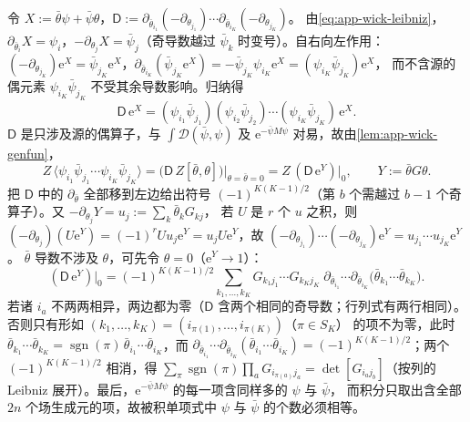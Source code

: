 \documentclass[UTF8,a4paper,11pt,fontset=fandol]{ctexart}
\makeatletter
\theoremstyle{cplain}
\theoremstyle{cdefinition}
\theoremstyle{cremark}
\renewcommand{\proofname}{证明}
\renewenvironment{proof}[1][\proofname]{\par\pushQED{\qed}\normalfont\topsep6\p@\@plus6\p@\relax
  \trivlist\item[\hskip\labelsep\itshape #1\hspace{0.5em}]\ignorespaces}{\popQED\endtrivlist\@endpefalse}
\numberwithin{equation}{section}
\newcommand{\ee}{\mathrm{e}}                        %
\makeatother
\begin{document}
\begin{proof}
令 $X:=\bar\theta\psi+\bar\psi\theta$，$\mathsf D:=\partial_{\bar\theta_{i_1}}(-\partial_{\theta_{j_1}})\cdots\partial_{\bar\theta_{i_K}}(-\partial_{\theta_{j_K}})$。
由\cref{eq:app-wick-leibniz}，$\partial_{\bar\theta_i}X=\psi_i$，$-\partial_{\theta_j}X=\bar\psi_j$（奇导数越过 $\bar\psi_k$ 时变号）。自右向左作用：
$(-\partial_{\theta_{j_K}})\ee^X=\bar\psi_{j_K}\ee^X$，$\partial_{\bar\theta_{i_K}}(\bar\psi_{j_K}\ee^X)=-\bar\psi_{j_K}\psi_{i_K}\ee^X=(\psi_{i_K}\bar\psi_{j_K})\ee^X$，
而不含源的偶元素 $\psi_{i_K}\bar\psi_{j_K}$ 不受其余导数影响。归纳得
\begin{equation*}
\mathsf D\,\ee^X=(\psi_{i_1}\bar\psi_{j_1})(\psi_{i_2}\bar\psi_{j_2})\cdots(\psi_{i_K}\bar\psi_{j_K})\,\ee^X .
\end{equation*}
$\mathsf D$ 是只涉及源的偶算子，与 $\int\mathcal D(\bar\psi,\psi)$ 及 $\ee^{-\bar\psi M\psi}$ 对易，故由\cref{lem:app-wick-genfun}，
\begin{equation*}
Z\,\bigl\langle\psi_{i_1}\bar\psi_{j_1}\cdots\psi_{i_K}\bar\psi_{j_K}\bigr\rangle=\bigl(\mathsf D\,Z[\bar\theta,\theta]\bigr)\big|_{\theta=\bar\theta=0}=Z\,(\mathsf D\,\ee^{Y})\big|_0,\qquad Y:=\bar\theta G\theta .
\end{equation*}
把 $\mathsf D$ 中的 $\partial_{\bar\theta}$ 全部移到左边给出符号 $(-1)^{K(K-1)/2}$（第 $b$ 个需越过 $b-1$ 个奇算子）。又 $-\partial_{\theta_j}Y=u_j:=\sum_k\bar\theta_kG_{kj}$，
若 $U$ 是 $r$ 个 $u$ 之积，则 $(-\partial_{\theta_j})(U\ee^Y)=(-1)^rUu_j\ee^Y=u_jU\ee^Y$，故 $(-\partial_{\theta_{j_1}})\cdots(-\partial_{\theta_{j_K}})\ee^Y=u_{j_1}\cdots u_{j_K}\ee^Y$。
$\bar\theta$ 导数不涉及 $\theta$，可先令 $\theta=0$（$\ee^Y\to1$）：
\begin{equation*}
(\mathsf D\,\ee^Y)\big|_0=(-1)^{K(K-1)/2}\sum_{k_1,\dots,k_K}G_{k_1j_1}\cdots G_{k_Kj_K}\;
\partial_{\bar\theta_{i_1}}\cdots\partial_{\bar\theta_{i_K}}\bigl(\bar\theta_{k_1}\cdots\bar\theta_{k_K}\bigr).
\end{equation*}
若诸 $i_a$ 不两两相异，两边都为零（$\mathsf D$ 含两个相同的奇导数；行列式有两行相同）。否则只有形如 $(k_1,\dots,k_K)=(i_{\pi(1)},\dots,i_{\pi(K)})$（$\pi\in S_K$）
的项不为零，此时 $\bar\theta_{k_1}\cdots\bar\theta_{k_K}=\operatorname{sgn}(\pi)\,\bar\theta_{i_1}\cdots\bar\theta_{i_K}$，而
$\partial_{\bar\theta_{i_1}}\cdots\partial_{\bar\theta_{i_K}}(\bar\theta_{i_1}\cdots\bar\theta_{i_K})=(-1)^{K(K-1)/2}$；两个 $(-1)^{K(K-1)/2}$ 相消，得
$\sum_\pi\operatorname{sgn}(\pi)\prod_aG_{i_{\pi(a)}j_a}=\det[G_{i_aj_b}]$（按列的 Leibniz 展开）。最后，$\ee^{-\bar\psi M\psi}$ 的每一项含同样多的 $\psi$ 与 $\bar\psi$，
而积分只取出含全部 $2n$ 个场生成元的项，故被积单项式中 $\psi$ 与 $\bar\psi$ 的个数必须相等。
\end{proof}
\end{document}
